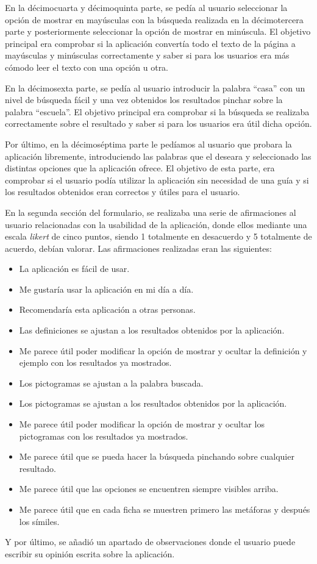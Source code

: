 En la décimocuarta y décimoquinta parte, se pedía al usuario seleccionar la opción de mostrar en mayúsculas con la búsqueda realizada en la décimotercera parte y posteriormente seleccionar la opción de mostrar en minúscula. El objetivo principal era comprobar si la aplicación convertía todo el texto de la página a mayúsculas y minúsculas correctamente y saber si para los usuarios era más cómodo leer el texto con una opción u otra.

En la décimosexta parte, se pedía al usuario introducir la palabra ``casa'' con un nivel de búsqueda fácil y una vez obtenidos los resultados pinchar sobre la palabra ``escuela''. El objetivo principal era comprobar si la búsqueda se realizaba correctamente sobre el resultado y saber si para los usuarios era útil dicha opción.

Por último, en la décimoséptima parte le pedíamos al usuario que probara la aplicación libremente, introduciendo las palabras que el deseara y seleccionado las distintas opciones que la aplicación ofrece. El objetivo de esta parte, era comprobar si el usuario podía utilizar la aplicación sin necesidad de una guía y si los resultados obtenidos eran correctos y útiles para el usuario.

En la segunda sección del formulario, se realizaba una serie de afirmaciones al usuario relacionadas con la usabilidad de la aplicación, donde ellos mediante una escala \textit{likert} de cinco puntos, siendo 1 totalmente en desacuerdo y 5 totalmente de acuerdo, debían valorar. Las afirmaciones realizadas eran las siguientes:
\begin{itemize}
	\item La aplicación es fácil de usar.
	\item Me gustaría usar la aplicación en mi día a día.
	\item Recomendaría esta aplicación a otras personas.
	\item Las definiciones se ajustan a los resultados obtenidos por la aplicación.
	\item Me parece útil poder modificar la opción de mostrar y ocultar la definición y ejemplo con los resultados ya mostrados.
	\item Los pictogramas se ajustan a la palabra buscada.
	\item Los pictogramas se ajustan a los resultados obtenidos por la aplicación.
	\item Me parece útil poder modificar la opción de mostrar y ocultar los pictogramas con los resultados ya mostrados.
	\item Me parece útil que se pueda hacer la búsqueda pinchando sobre cualquier resultado.
	\item Me parece útil que las opciones se encuentren siempre visibles arriba.
	\item Me parece útil que en cada ficha se muestren primero las metáforas y después los símiles.
	
\end{itemize}
 	Y por último, se añadió un apartado de observaciones donde el usuario puede escribir su opinión escrita sobre la aplicación.
 	
